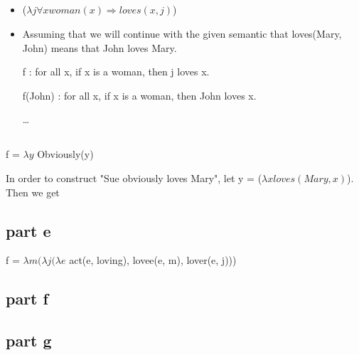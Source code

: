 \documentclass[12pt, letterpaper]{article}
\begin{document}
\subsection{}

\begin{itemize}  
\item %
($\lambda j \forall x woman(x) \Rightarrow loves(x,j)$) 
\item %
Assuming that we will continue with the given semantic that loves(Mary, John) means that John loves Mary.

f : for all x, if x is a woman, then j loves x.

f(John) : for all x, if x is a woman, then John loves x.

\ldots 
\end{itemize}

\subsection{}

f = $\lambda y$ Obviously(y)

In order to construct "Sue obviously loves Mary", let y = ($\lambda x loves(Mary, x)$). Then we get 


\subsection{part e}
f = $\lambda m ( \lambda j ( \lambda e$ act(e, loving), lovee(e, m), lover(e, j)))

\subsection{part f}

\subsection{part g}
\end{document}
